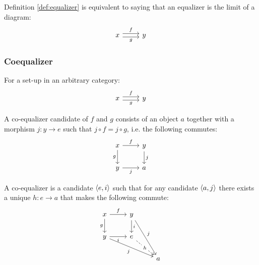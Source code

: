 \begin{definition}
  Definition \ref{def:equalizer} is equivalent to saying that an equalizer is
  the limit of a diagram:
  \[\begin{tikzcd}[ampersand replacement=\&]
    x \& y
    \arrow["f", shift left=1, from=1-1, to=1-2]
    \arrow["g"', shift right=1, from=1-1, to=1-2]
  \end{tikzcd}\]
\end{definition}

\subsubsection*{Coequalizer}

\begin{definition}
  For a set-up in an arbitrary category:
  \parencite{leinster:basic_category_theory}
  \[\begin{tikzcd}[ampersand replacement=\&]
    x \& y
    \arrow["f", shift left=1, from=1-1, to=1-2]
    \arrow["g"', shift right=1, from=1-1, to=1-2]
  \end{tikzcd}\]

  A co-equalizer candidate of $f$ and $g$ consists of an object $a$ together
  with a morphism $j:y\to e$ such that $j\circ f = j\circ g$, i.e. the following
  commutes:
  \[\begin{tikzcd}[ampersand replacement=\&]
    x \& y \\
    y \& a
    \arrow["j"', from=2-1, to=2-2]
    \arrow["g"', from=1-1, to=2-1]
    \arrow["f", from=1-1, to=1-2]
    \arrow["j", from=1-2, to=2-2]
  \end{tikzcd}\]

  A co-equalizer is a candidate $\langle e, i\rangle$ such that for any candidate $\langle a,
  j\rangle$ there exists a unique $h: e\to a$ that makes the following commute:
  \[\begin{tikzcd}[ampersand replacement=\&]
    x \& y \\
    y \& e \\
    \&\& a
    \arrow["i", from=1-2, to=2-2]
    \arrow["i"', from=2-1, to=2-2]
    \arrow["g"', from=1-1, to=2-1]
    \arrow["f", from=1-1, to=1-2]
    \arrow["j"', from=2-1, to=3-3]
    \arrow["j", from=1-2, to=3-3]
    \arrow["h"{description}, dashed, from=2-2, to=3-3]
  \end{tikzcd}\]
\end{definition}

